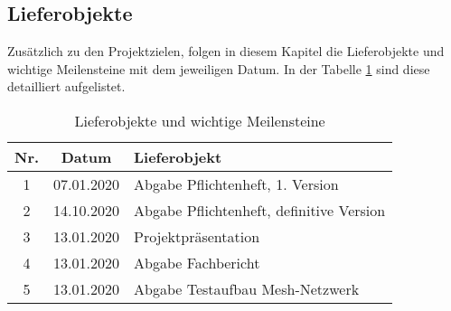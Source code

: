 \clearpage
\subsection{Lieferobjekte}\label{subsec:Lieferobjekte}
Zusätzlich zu den Projektzielen, folgen in diesem Kapitel die Lieferobjekte und wichtige Meilensteine mit dem jeweiligen Datum. In der Tabelle \ref{tbl:Lieferobjekte} sind diese detailliert aufgelistet.  


\begin{table}[H]
     \centering
\begin{tabular}{|c|c|l|}\hline
   \textbf{Nr.} & \textbf{Datum} & \textbf{Lieferobjekt} \\ \hline
   
   1 & 07.01.2020 & Abgabe Pflichtenheft, 1. Version\\ \hline
   2 & 14.10.2020 & Abgabe Pflichtenheft, definitive Version\\ \hline
   3 & 13.01.2020 & Projektpräsentation \\ \hline
   4 & 13.01.2020 & Abgabe Fachbericht \\ \hline
   5 & 13.01.2020 & Abgabe Testaufbau Mesh-Netzwerk \\ \hline
   
   

   
 \end{tabular}
     \caption{Lieferobjekte und wichtige Meilensteine}
     \label{tbl:Lieferobjekte}
\end{table}








